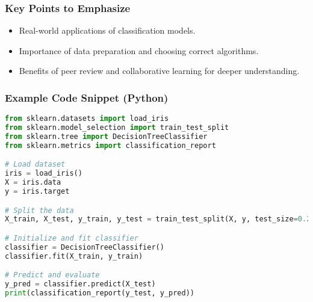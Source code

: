 \documentclass[aspectratio=169]{beamer}
\begin{document}
\begin{frame}[fragile]
    \frametitle{Key Points to Emphasize}
    \begin{itemize}
        \item Real-world applications of classification models.
        \item Importance of data preparation and choosing correct algorithms.
        \item Benefits of peer review and collaborative learning for deeper understanding.
    \end{itemize}
\end{frame}

\begin{frame}[fragile]
    \frametitle{Example Code Snippet (Python)}
    \begin{lstlisting}[language=Python]
from sklearn.datasets import load_iris
from sklearn.model_selection import train_test_split
from sklearn.tree import DecisionTreeClassifier
from sklearn.metrics import classification_report

# Load dataset
iris = load_iris()
X = iris.data
y = iris.target

# Split the data
X_train, X_test, y_train, y_test = train_test_split(X, y, test_size=0.2, random_state=42)

# Initialize and fit classifier
classifier = DecisionTreeClassifier()
classifier.fit(X_train, y_train)

# Predict and evaluate
y_pred = classifier.predict(X_test)
print(classification_report(y_test, y_pred))
    \end{lstlisting}
\end{frame}
\end{document}
